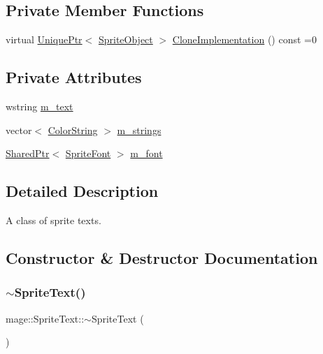 \subsection*{Private Member Functions}
\begin{DoxyCompactItemize}
\item 
virtual \hyperlink{namespacemage_a8c307fbcc33bce9b7f2aa4c26c3b95cf}{Unique\+Ptr}$<$ \hyperlink{classmage_1_1_sprite_object}{Sprite\+Object} $>$ \hyperlink{classmage_1_1_sprite_text_a2b9f59a1730f8b9691f173251a2b4944}{Clone\+Implementation} () const =0
\end{DoxyCompactItemize}
\subsection*{Private Attributes}
\begin{DoxyCompactItemize}
\item 
wstring \hyperlink{classmage_1_1_sprite_text_a807d5dc467ef16f6c83762dfe6ad3391}{m\+\_\+text}
\item 
vector$<$ \hyperlink{structmage_1_1_color_string}{Color\+String} $>$ \hyperlink{classmage_1_1_sprite_text_ab528f96257fd7e690be765241b2d76f7}{m\+\_\+strings}
\item 
\hyperlink{namespacemage_a1e01ae66713838a7a67d30e44c67703e}{Shared\+Ptr}$<$ \hyperlink{classmage_1_1_sprite_font}{Sprite\+Font} $>$ \hyperlink{classmage_1_1_sprite_text_a922e37fbcbc431e815ebabe82e4528b0}{m\+\_\+font}
\end{DoxyCompactItemize}


\subsection{Detailed Description}
A class of sprite texts. 

\subsection{Constructor \& Destructor Documentation}
\hypertarget{classmage_1_1_sprite_text_aa30d68a79775dce902c190f2cd298bb4}{}\label{classmage_1_1_sprite_text_aa30d68a79775dce902c190f2cd298bb4} 
\subsubsection{\texorpdfstring{$\sim$\+Sprite\+Text()}{~SpriteText()}}
{\footnotesize\ttfamily mage\+::\+Sprite\+Text\+::$\sim$\+Sprite\+Text (\begin{DoxyParamCaption}{ }\end{DoxyParamCaption})\hspace{0.3cm}{\ttfamily [virtual]}}

